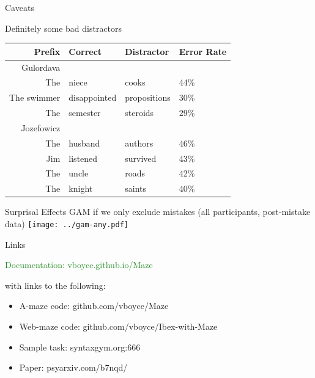 \documentclass[12pt, xcolor=beamer,table,usenames,dvipsnames, ignorenonframetext, ngerman,t]{beamer}
\begin{document}
\begin{frame}{Caveats}
	
	{\large Definitely some bad distractors}
	\begin{table}
		
		
		\begin{tabular}{rlll}
			Prefix & Correct & Distractor & Error Rate \\
			\hline
			\hline
			Gulordava&&&\\
			\hline
			The & niece & cooks & 44\%\\
			The swimmer & disappointed & propositions & 30\%\\
			The & semester & steroids & 29\%\\
			\hline
			\hline
			Jozefowicz&&&\\
			\hline
			The & husband & authors & 46\%\\
			Jim & listened & survived & 43\%\\
			The & uncle & roads & 42\%\\
			The & knight & saints & 40\%\\
		\end{tabular}
	\end{table}
	
\end{frame}

\begin{frame}{Surprisal Effects}
	GAM if we only exclude mistakes (all participants, post-mistake data)
	\texttt{[image: ../gam-any.pdf]}	
\end{frame}

\begin{frame}{Links}
	
	\textcolor{ForestGreen}{\large Documentation: vboyce.github.io/Maze}
	
	with links to the following:
	\begin{itemize}
		
		\item A-maze code: github.com/vboyce/Maze
		
		\item Web-maze code: github.com/vboyce/Ibex-with-Maze
		
		\item Sample task: syntaxgym.org:666
		
		\item Paper: psyarxiv.com/b7nqd/
	\end{itemize}
\end{frame}
\end{document}
